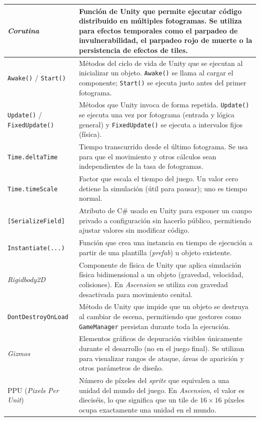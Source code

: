 {\begin{longtable}{|p{}|p{}|}
\textit{Corutina} & Función de Unity que permite ejecutar código distribuido en múltiples fotogramas. Se utiliza para efectos temporales como el parpadeo de invulnerabilidad, el parpadeo rojo de muerte o la persistencia de efectos de tiles. \\ \hline
\texttt{Awake()} / \texttt{Start()} & Métodos del ciclo de vida de Unity que se ejecutan al inicializar un objeto. \texttt{Awake()} se llama al cargar el componente; \texttt{Start()} se ejecuta justo antes del primer fotograma. \\ \hline
\texttt{Update()} / \texttt{FixedUpdate()} & Métodos que Unity invoca de forma repetida. \texttt{Update()} se ejecuta una vez por fotograma (entrada y lógica general) y \texttt{FixedUpdate()} se ejecuta a intervalos fijos (física). \\ \hline
\texttt{Time.deltaTime} & Tiempo transcurrido desde el último fotograma. Se usa para que el movimiento y otros cálculos sean independientes de la tasa de fotogramas. \\ \hline
\texttt{Time.timeScale} & Factor que escala el tiempo del juego. Un valor cero detiene la simulación (útil para pausar); uno es tiempo normal. \\ \hline
\texttt{[SerializeField]} & Atributo de C\# usado en Unity para exponer un campo privado a configuración sin hacerlo público, permitiendo ajustar valores sin modificar código. \\ \hline
\texttt{Instantiate(...)} & Función que crea una instancia en tiempo de ejecución a partir de una plantilla (\textit{prefab}) u objeto existente. \\ \hline
\textit{Rigidbody2D} & Componente de física de Unity que aplica simulación física bidimensional a un objeto (gravedad, velocidad, colisiones). En \textit{Ascension} se utiliza con gravedad desactivada para movimiento cenital. \\ \hline
\texttt{DontDestroyOnLoad} & Método de Unity que impide que un objeto se destruya al cambiar de escena, permitiendo que gestores como \texttt{GameManager} persistan durante toda la ejecución. \\ \hline
\textit{Gizmos} & Elementos gráficos de depuración visibles únicamente durante el desarrollo (no en el juego final). Se utilizan para visualizar rangos de ataque, áreas de aparición y otros parámetros de diseño. \\ \hline
PPU (\textit{Pixels Per Unit}) & Número de píxeles del \textit{sprite} que equivalen a una unidad del mundo del juego. En \textit{Ascension}, el valor es dieciséis, lo que significa que un tile de $16 \times 16$ píxeles ocupa exactamente una unidad en el mundo. \\ \hline
\end{longtable}
}


